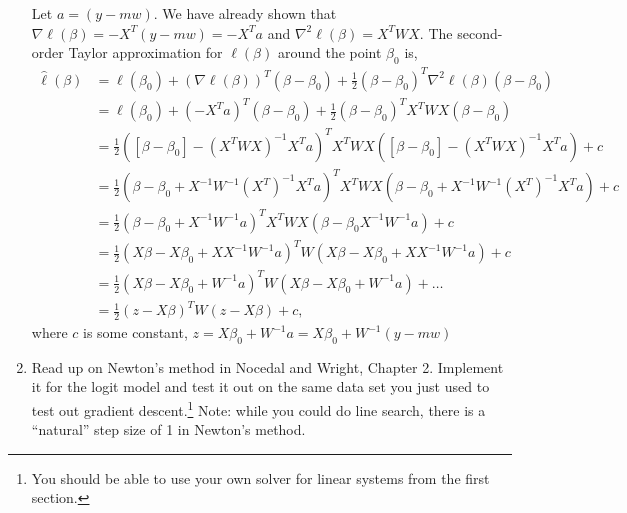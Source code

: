 \documentclass{article}
\begin{document}
\begin{enumerate}[label=(\Alph*)]
{	Let $a = (y-mw)$. We have already shown that $\nabla \ell(\beta) = -X^T (y-mw) = -X^T a$ and $\nabla^2 \ell (\beta) = X^T W X$. The second-order Taylor approximation for $\ell(\beta)$ around the point $\beta_0$ is,
	\begin{align}
		\hat{\ell}(\beta) &= \ell(\beta_0)+(\nabla \ell(\beta))^T(\beta-\beta_0) + \frac{1}{2}(\beta-\beta_0)^T \nabla^2 \ell(\beta) (\beta-\beta_0) \\
		&= \ell(\beta_0) + (-X^T a)^T(\beta - \beta_0) + \frac{1}{2}(\beta - \beta_0)^T X^T W X (\beta - \beta_0) \\
		&= \frac{1}{2} ( [ \beta - \beta_0 ] -(X^T W X)^{-1} X^T a )^T X^T W X ( [ \beta - \beta_0 ] -(X^T W X)^{-1} X^T a ) + c \\ 
		&= \frac{1}{2} (\beta - \beta_0  + X^{-1}W^{-1}(X^T)^{-1}X^T a )^T X^T W X (\beta - \beta_0 + X^{-1}W^{-1}(X^T)^{-1}X^T a ) + c \\
		&= \frac{1}{2} (\beta - \beta_0 + X^{-1}W^{-1} a )^T X^T W X (\beta - \beta_0 X^{-1}W^{-1} a ) + c \\
		&= \frac{1}{2} (X\beta - X\beta_0 + XX^{-1}W^{-1} a )^T W (X\beta - X\beta_0 + X X^{-1}W^{-1} a ) + c \\
		&= \frac{1}{2} (X\beta - X\beta_0 + W^{-1} a )^T W (X\beta - X\beta_0 + W^{-1} a ) + \ldots \\
		&= \frac{1}{2}(z-X\beta)^T W (z-X\beta) + c,
	\end{align}
	where $c$ is some constant, $z = X\beta_0 + W^{-1}a = X\beta_0 + W^{-1}(y-mw)$
}


\item Read up on Newton's method in Nocedal and Wright, Chapter 2.  Implement it for the logit model and test it out on the same data set you just used to test out gradient descent.\footnote{You should be able to use your own solver for linear systems from the first section.}  Note: while you could do line search, there is a ``natural'' step size of 1 in Newton's method.

{\color{blue}

}
\end{enumerate}
\end{document}
